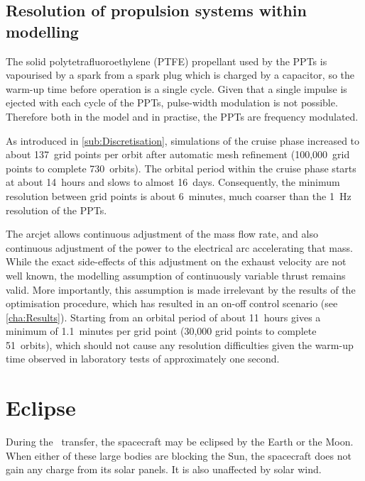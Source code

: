 \subsection{Resolution of propulsion systems within modelling}

The solid polytetrafluoroethylene (PTFE) propellant used by the PPTs is vapourised by a spark from a spark plug which is charged by a capacitor, so the warm-up time before operation is a single cycle. Given that a single impulse is ejected with each cycle of the PPTs, pulse-width modulation is not possible. Therefore both in the model and in practise, the PPTs are frequency modulated. 

As introduced in \autoref{sub:Discretisation}, simulations of the cruise phase increased to about 137~grid points per orbit after automatic mesh refinement (100,000~grid points to complete 730~orbits). The orbital period within the cruise phase starts at about 14~hours and slows to almost 16~days. Consequently, the minimum resolution between grid points is about 6~minutes, much coarser than the 1~Hz resolution of the PPTs.

The arcjet allows continuous adjustment of the mass flow rate, and also continuous adjustment of the power to the electrical arc accelerating that mass. While the exact side-effects of this adjustment on the exhaust velocity are not well known, the modelling assumption of continuously variable thrust remains valid. More importantly, this assumption is made irrelevant by the results of the optimisation procedure, which has resulted in an on-off control scenario (see \autoref{cha:Results}). Starting from an orbital period of about 11~hours gives a minimum of 1.1~minutes per grid point (30,000 grid points to complete 51~orbits), which should not cause any resolution difficulties given the warm-up time observed in laboratory tests of approximately one second. 


\section{Eclipse} \label{sec:Eclipse}

During the \BW\ transfer, the spacecraft may be eclipsed by the Earth or the Moon. When either of these large bodies are blocking the Sun, the spacecraft does not gain any charge from its solar panels. It is also unaffected by solar wind. 

